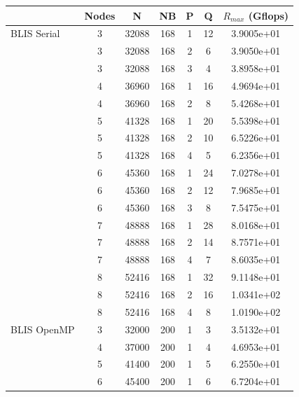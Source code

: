 \documentclass{report}
\begin{document}
\begin{table}
\begin{center}
\begin{tabular}{ |l|c|c|c|c|c|c| } 
\hline
                & Nodes & N & NB & P & Q & $R_{max}$ (Gflops) \\ 
\hline
BLIS Serial     & 3 & 32088 & 168 & 1 & 12 & 3.9005e+01 \\ 
                & 3 & 32088 & 168 & 2 &  6 & 3.9050e+01 \\ 
                & 3 & 32088 & 168 & 3 &  4 & 3.8958e+01 \\ 
                \cline{2-7} 
                & 4 & 36960 & 168 & 1 & 16 & 4.9694e+01 \\ 
                & 4 & 36960 & 168 & 2 &  8 & 5.4268e+01\\ 
                \cline{2-7} 
                & 5 & 41328 & 168 & 1 & 20 & 5.5398e+01 \\ 
                & 5 & 41328 & 168 & 2 & 10 & 6.5226e+01 \\ 
                & 5 & 41328 & 168 & 4 &  5 & 6.2356e+01 \\ 
                \cline{2-7} 
                & 6 & 45360 & 168 & 1 & 24 & 7.0278e+01 \\ 
                & 6 & 45360 & 168 & 2 & 12 & 7.9685e+01 \\ 
                & 6 & 45360 & 168 & 3 &  8 & 7.5475e+01 \\ 
                \cline{2-7} 
                & 7 & 48888 & 168 & 1 & 28 & 8.0168e+01 \\ 
                & 7 & 48888 & 168 & 2 & 14 & 8.7571e+01 \\ 
                & 7 & 48888 & 168 & 4 &  7 & 8.6035e+01 \\ 
                \cline{2-7} 
                & 8 & 52416 & 168 & 1 & 32 & 9.1148e+01 \\ 
                & 8 & 52416 & 168 & 2 & 16 & 1.0341e+02 \\ 
                & 8 & 52416 & 168 & 4 &  8 & 1.0190e+02 \\ 
\hline
BLIS OpenMP     & 3 & 32000 & 200 & 1 & 3 & 3.5132e+01 \\ 
                \cline{2-7} 
                & 4 & 37000 & 200 & 1 & 4 & 4.6953e+01 \\ 
                \cline{2-7} 
                & 5 & 41400 & 200 & 1 & 5 & 6.2550e+01 \\ 
                \cline{2-7} 
                & 6 & 45400 & 200 & 1 & 6 & 6.7204e+01 \\ 

\end{tabular}
\end{center}
\end{table}
\end{document}
